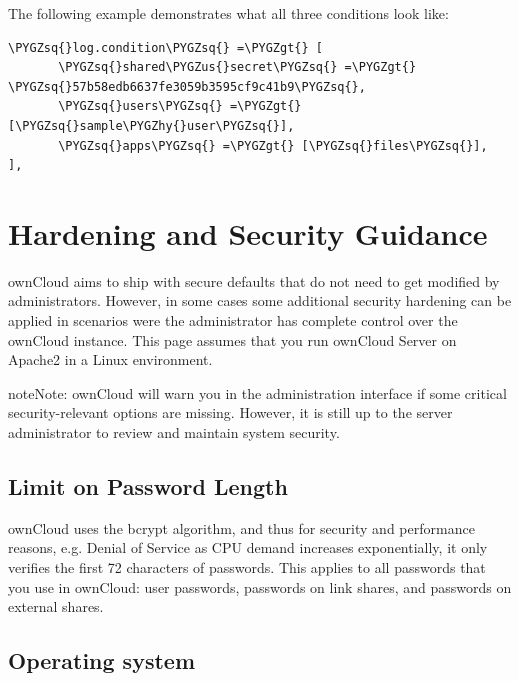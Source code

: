 \documentclass[letterpaper,10pt,english]{sphinxmanual}
\def\PYGZus{\char`\_}
\def\PYGZgt{\char`\>}
\def\PYGZhy{\char`\-}
\def\PYGZsq{\char`\'}
\begin{document}
The following example demonstrates what all three conditions look like:

\begin{Verbatim}[commandchars=\\\{\}]
\PYGZsq{}log.condition\PYGZsq{} =\PYGZgt{} [
       \PYGZsq{}shared\PYGZus{}secret\PYGZsq{} =\PYGZgt{} \PYGZsq{}57b58edb6637fe3059b3595cf9c41b9\PYGZsq{},
       \PYGZsq{}users\PYGZsq{} =\PYGZgt{} [\PYGZsq{}sample\PYGZhy{}user\PYGZsq{}],
       \PYGZsq{}apps\PYGZsq{} =\PYGZgt{} [\PYGZsq{}files\PYGZsq{}],
],
\end{Verbatim}


\section{Hardening and Security Guidance}
\label{configuration_server/harden_server:php-date-function}\label{configuration_server/harden_server::doc}\label{configuration_server/harden_server:hardening-and-security-guidance}
ownCloud aims to ship with secure defaults that do not need to get modified by
administrators. However, in some cases some additional security hardening can be
applied in scenarios were the administrator has complete control over
the ownCloud instance. This page assumes that you run ownCloud Server on Apache2
in a Linux environment.

\begin{notice}{note}{Note:}
ownCloud will warn you in the administration interface if some
critical security-relevant options are missing. However, it is still up to
the server administrator to review and maintain system security.
\end{notice}


\subsection{Limit on Password Length}
\label{configuration_server/harden_server:limit-on-password-length}
ownCloud uses the bcrypt algorithm, and thus for security and performance
reasons, e.g. Denial of Service as CPU demand increases exponentially, it only
verifies the first 72 characters of passwords. This applies to all passwords
that you use in ownCloud: user passwords, passwords on link shares, and
passwords on external shares.


\subsection{Operating system}
\label{configuration_server/harden_server:operating-system}
\end{document}
